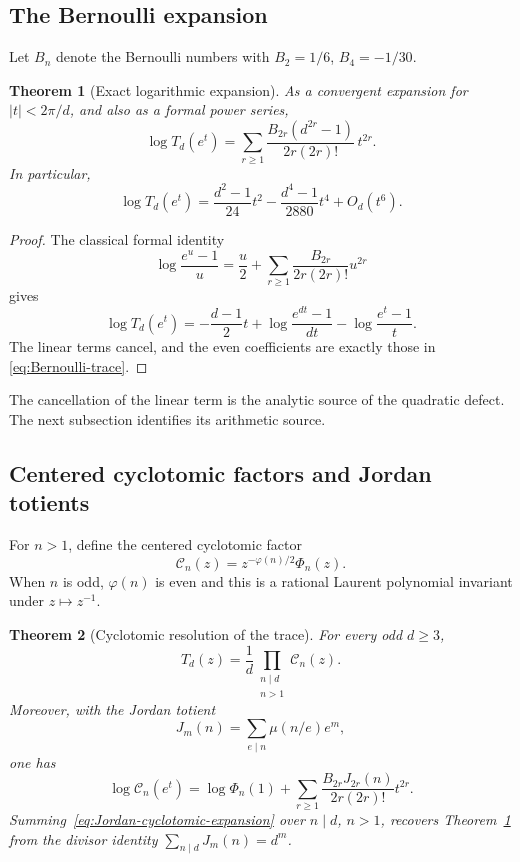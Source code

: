 \documentclass[11pt,oneside]{article}
\newtheorem{theorem}{Theorem}[section]
\theoremstyle{definition}
\theoremstyle{remark}
\begin{document}
\subsection{The Bernoulli expansion}

Let \(B_n\) denote the Bernoulli numbers with \(B_2=1/6\), \(B_4=-1/30\).

\begin{theorem}[Exact logarithmic expansion]
\label{thm:bernoulli-trace}
As a convergent expansion for \(|t|<2\pi/d\), and also as a formal power series,
\begin{equation}
 \boxed{
 \log T_d(e^t)=\sum_{r\ge1}
 \frac{B_{2r}(d^{2r}-1)}{2r(2r)!}\,t^{2r}.}
 \label{eq:Bernoulli-trace}
\end{equation}
In particular,
\begin{equation}
 \log T_d(e^t)=\frac{d^2-1}{24}t^2
 -\frac{d^4-1}{2880}t^4+O_d(t^6).
 \label{eq:trace-first-terms}
\end{equation}
\end{theorem}

\begin{proof}
The classical formal identity
\[
 \log\frac{e^u-1}{u}=\frac u2+
 \sum_{r\ge1}\frac{B_{2r}}{2r(2r)!}u^{2r}
\]
gives
\[
 \log T_d(e^t)=-\frac{d-1}{2}t
 +\log\frac{e^{dt}-1}{dt}-\log\frac{e^t-1}{t}.
\]
The linear terms cancel, and the even coefficients are exactly those in
\eqref{eq:Bernoulli-trace}.
\end{proof}

The cancellation of the linear term is the analytic source of the quadratic defect.  The
next subsection identifies its arithmetic source.

\subsection{Centered cyclotomic factors and Jordan totients}

For \(n>1\), define the centered cyclotomic factor
\begin{equation}
 \mathscr C_n(z)=z^{-\varphi(n)/2}\Phi_n(z).
 \label{eq:centered-cyclotomic}
\end{equation}
When \(n\) is odd, \(\varphi(n)\) is even and this is a rational Laurent polynomial invariant
under \(z\mapsto z^{-1}\).

\begin{theorem}[Cyclotomic resolution of the trace]
\label{thm:cyclotomic-resolution}
For every odd \(d\ge3\),
\begin{equation}
 \boxed{
 T_d(z)=\frac1d\prod_{\substack{n\mid d\\n>1}}\mathscr C_n(z).}
 \label{eq:trace-cyclotomic-factorization}
\end{equation}
Moreover, with the Jordan totient
\[
 J_m(n)=\sum_{e\mid n}\mu(n/e)e^m,
\]
one has
\begin{equation}
 \log\mathscr C_n(e^t)
 =\log\Phi_n(1)+
 \sum_{r\ge1}\frac{B_{2r}J_{2r}(n)}{2r(2r)!}t^{2r}.
 \label{eq:Jordan-cyclotomic-expansion}
\end{equation}
Summing~\eqref{eq:Jordan-cyclotomic-expansion} over \(n\mid d\), \(n>1\), recovers
Theorem~\ref{thm:bernoulli-trace} from the divisor identity
\(\sum_{n\mid d}J_m(n)=d^m\).
\end{theorem}
\end{document}
